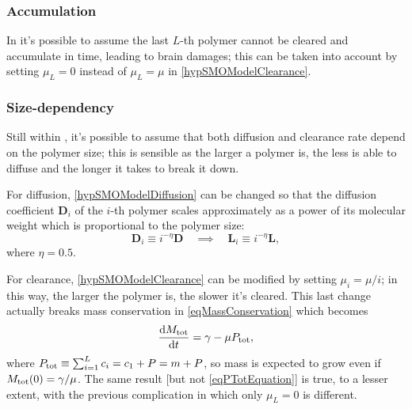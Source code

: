 \documentclass{article}
\begin{document}
            \subsubsection{Accumulation}\label{secComplicationsAccumulation}

                In \SMOcontinuous{} it's possible to assume the last $L$-th polymer cannot be cleared and accumulate in time, leading to brain damages; this can be taken into account by setting $\mu_L=0$ instead of $\mu_L=\mu$ in \ref{hypSMOModelClearance}.

            \subsubsection{Size-dependency}\label{secComplicationsSizeDependency}

                Still within \SMOcontinuous{}, it's possible to assume that both diffusion and clearance rate depend on the polymer size; this is sensible as the larger a polymer is, the less is able to diffuse and the longer it takes to break it down.

                For diffusion, \ref{hypSMOModelDiffusion} can be changed so that the diffusion coefficient $\mathbf D_i$ of the $i$-th polymer scales approximately as a power of its molecular weight which is proportional to the polymer size: \cite[(23) on p. 5]{Goriely2019}
                \begin{equation}
                    \mathbf D_i\equiv i^{-\eta}\mathbf D
                    \quad\implies\quad
                    \mathbf L_i\equiv i^{-\eta}\mathbf L,
                    \label{eqSizeDependentDiffusion}
                \end{equation}
                where $\eta=0.5$.

                For clearance, \ref{hypSMOModelClearance} can be modified by setting $\mu_i=\mu/i$; in this way, the larger the polymer is, the slower it's clear\-ed. This last change actually breaks mass conservation in \eqref{eqMassConservation} which becomes \cite[(47) on p. 8]{Goriely2019}
                \begin{equation}
                    \frac{\mathrm{d}M_{\text{tot}}}{\mathrm{d}t}=\gamma-\mu P_{\text{tot}},
                    \label{eqPTotEquation}
                \end{equation}
                where $P_{\text{tot}}\equiv\sum_{i=1}^Lc_i=c_1+P=m+P$, so mass is expected to grow even if $M_{\text{tot}}(0)=\gamma/\mu$. The same result [but not \eqref{eqPTotEquation}] is true, to a lesser extent, with the previous complication in which only $\mu_L=0$ is different.
\end{document}
